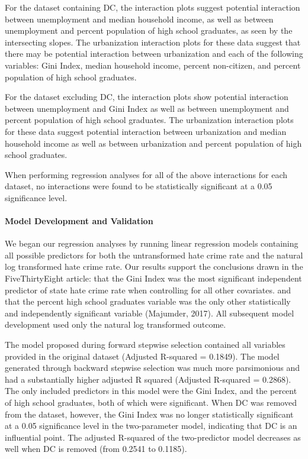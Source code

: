\documentclass[
]{article}
\begin{document}
For the dataset containing DC, the interaction plots suggest potential
interaction between unemployment and median household income, as well as
between unemployment and percent population of high school graduates, as
seen by the intersecting slopes. The urbanization interaction plots for
these data suggest that there may be potential interaction between
urbanization and each of the following variables: Gini Index, median
household income, percent non-citizen, and percent population of high
school graduates.

For the dataset excluding DC, the interaction plots show potential
interaction between unemployment and Gini Index as well as between
unemployment and percent population of high school graduates. The
urbanization interaction plots for these data suggest potential
interaction between urbanization and median household income as well as
between urbanization and percent population of high school graduates.

When performing regression analyses for all of the above interactions
for each dataset, no interactions were found to be statistically
significant at a 0.05 significance level.

\hypertarget{model-development-and-validation-1}{%
\paragraph{Model Development and
Validation}\label{model-development-and-validation-1}}

We began our regression analyses by running linear regression models
containing all possible predictors for both the untransformed hate crime
rate and the natural log transformed hate crime rate. Our results
support the conclusions drawn in the FiveThirtyEight article: that the
Gini Index was the most significant independent predictor of state hate
crime rate when controlling for all other covariates. and that the
percent high school graduates variable was the only other statistically
and independently significant variable (Majumder, 2017). All subsequent
model development used only the natural log transformed outcome.

The model proposed during forward stepwise selection contained all
variables provided in the original dataset (Adjusted R-squared =
0.1849). The model generated through backward stepwise selection was
much more parsimonious and had a substantially higher adjusted R squared
(Adjusted R-squared = 0.2868). The only included predictors in this
model were the Gini Index, and the percent of high school graduates,
both of which were significant. When DC was removed from the dataset,
however, the Gini Index was no longer statistically significant at a
0.05 significance level in the two-parameter model, indicating that DC
is an influential point. The adjusted R-squared of the two-predictor
model decreases as well when DC is removed (from 0.2541 to 0.1185).
\end{document}
